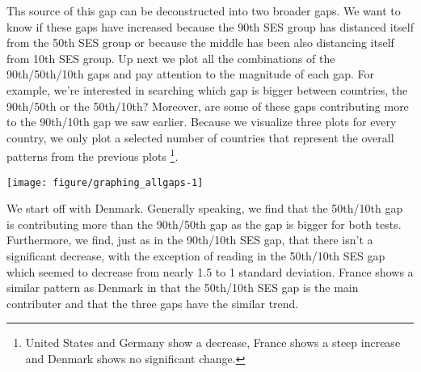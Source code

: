 \documentclass[11pt, a4paper]{article}\usepackage[]{graphicx}\usepackage[]{color}
\begin{document}
Ths source of this gap can be deconstructed into two broader gaps. We want to know if these gaps have increased because the 90th SES group has distanced itself from the 50th SES group or because the middle has been also distancing itself from 10th SES group. Up next we plot all the combinations of the 90th/50th/10th gaps and pay attention to the magnitude of each gap. For example, we're interested in searching which gap is bigger between countries, the 90th/50th or the 50th/10th? Moreover, are some of these gaps contributing more to the 90th/10th gap we saw earlier. Because we visualize three plots for every country, we only plot a selected number of countries that represent the overall patterns from the previous plots \footnote{United States and Germany show a decrease, France shows a steep increase and Denmark shows no significant change.}.

% 
% 
% 



{\centering \texttt{[image: figure/graphing\_allgaps-1]} 

}




We start off with Denmark. Generally speaking, we find that the 50th/10th gap is contributing more than the 90th/50th gap as the gap is bigger for both tests. Furthermore, we find, just as in the 90th/10th SES gap, that there isn't a significant decrease, with the exception of reading in the 50th/10th SES gap which seemed to decrease from nearly 1.5 to 1 standard deviation. France shows a similar pattern as Denmark in that the 50th/10th SES gap is the main contributer and that the three gaps have the similar trend. 
\end{document}
